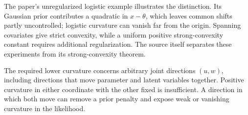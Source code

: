 \documentclass[11pt,a4paper]{report}
\begin{document}
The paper's unregularized logistic example illustrates the distinction.
Its Gaussian prior contributes a quadratic in \(x-\theta\), which leaves
common shifts partly uncontrolled; logistic curvature can vanish far from the
origin. Spanning covariates give strict convexity, while a uniform positive
strong-convexity constant requires additional regularization. The source itself
separates these experiments from its strong-convexity theorem.



The required lower curvature concerns arbitrary joint directions \((u,w)\), including directions that move parameter and latent variables together. Positive curvature in either coordinate with the other fixed is insufficient. A direction in which both move can remove a prior penalty and expose weak or vanishing curvature in the likelihood.
\end{document}
